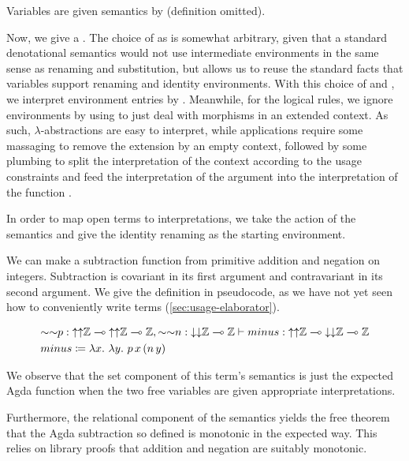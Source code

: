Variables are given semantics by  (definition omitted).


Now, we give a .
The choice of \AgdaBound{$\V$} as
\AgdaRecord{\AgdaUnderscore{}$\sqni$\AgdaUnderscore{}} is somewhat arbitrary,
given that a standard denotational semantics would not use intermediate
environments in the same sense as renaming and substitution, but allows us to
reuse the standard facts that variables support renaming and identity
environments.
With this choice of \AgdaBound{$\V$} and \AgdaBound{$\C$}, we interpret
environment entries by .
Meanwhile, for the logical rules, we ignore environments by using
 to just deal with morphisms in an extended context.
As such, $\lambda$-abstractions are easy to interpret, while applications
require some massaging to remove the extension by an empty context, followed by
some plumbing to split the interpretation of the context according to the usage
constraints and feed the interpretation of the argument  into
the interpretation of the function .


In order to map open terms to interpretations, we take the action of the
semantics and give the identity renaming as the starting environment.


\begin{example}
  We can make a subtraction function from primitive addition and negation on
  integers.
  Subtraction is covariant in its first argument and contravariant in its
  second argument.
  We give the definition in pseudocode, as we have not yet seen how to
  conveniently write terms (\cref{sec:usage-elaborator}).

  \begin{align*}
    &{\sim\sim}p :
      {\uparrow\uparrow}\mathbb Z \multimap
      {\uparrow\uparrow}\mathbb Z \multimap \mathbb Z,
      {\sim\sim}n : {\downarrow\downarrow}\mathbb Z \multimap \mathbb Z
      \vdash \mathnormal{minus} :
      {\uparrow\uparrow}\mathbb Z \multimap
      {\downarrow\downarrow}\mathbb Z \multimap
      \mathbb Z
    \\
    &\mathnormal{minus} \coloneqq \lambda x.~\lambda y.~p\,x\,(n\,y)
  \end{align*}

  We observe that the set component of this term's semantics is just the
  expected Agda function when the two free variables are given appropriate
  interpretations.


  Furthermore, the relational component of the semantics yields the free
  theorem that the Agda subtraction so defined is monotonic in the expected way.
  This relies on library proofs that addition and negation are suitably
  monotonic.

\end{example}

